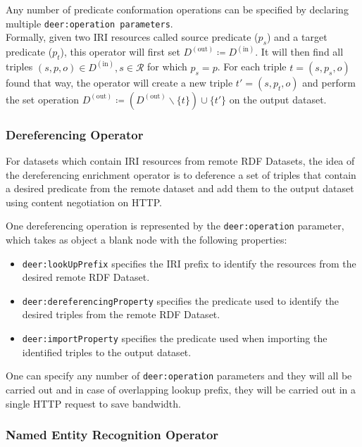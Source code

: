 Any number of predicate conformation operations can be specified by declaring multiple \texttt{deer:operation parameters}. \\

Formally, given two \ac{IRI} resources called source predicate ($p_s$) and a target predicate ($p_t$), this operator will first set $D^{(\text{out})}\coloneq D^{(\text{in})}$.
It will then find all triples $(s,p,o)\in D^{(\text{in})}, s\in \mathcal{R}$ for which $p_s=p$.
For each triple $t=(s,p_s,o)$ found that way, the operator will create a new triple $t'=(s,p_t,o)$  and perform the set operation $D^{(\text{out})}\coloneq (D^{(\text{out})}\backslash\{t\})\cup\{t'\}$ on the output dataset.

\subsubsection*{Dereferencing Operator}

For datasets which contain \ac{IRI} resources from remote \ac{RDF} Datasets, the idea of the dereferencing enrichment operator is to deference a set of triples that contain a desired predicate from the remote dataset and add them to the output dataset using content negotiation on \ac{HTTP}.

One dereferencing operation is represented by the \texttt{deer:operation} parameter, which takes as object a blank node with the following properties:

\begin{itemize}
  \item \texttt{deer:lookUpPrefix} specifies the \ac{IRI} prefix to identify the resources from the desired remote \ac{RDF} Dataset.
  \item \texttt{deer:dereferencingProperty} specifies the predicate used to identify the desired triples from the remote \ac{RDF} Dataset.
  \item \texttt{deer:importProperty} specifies the predicate used when importing the identified triples to the output dataset.
\end{itemize}

One can specify any number of \texttt{deer:operation} parameters and they will all be carried out and in case of overlapping lookup prefix, they will be carried out in a single \ac{HTTP} request to save bandwidth.

\subsubsection*{Named Entity Recognition Operator}

